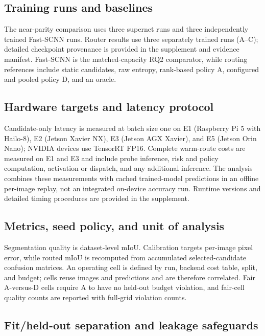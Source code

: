 \documentclass[a4paper,review,12pt]{elsarticle}
\newcommand{\miou}{mIoU}
\begin{document}
\subsection{Training runs and baselines}

The near-parity comparison uses three supernet runs and three independently trained Fast-SCNN runs. Router results use three separately trained runs (A--C); detailed checkpoint provenance is provided in the supplement and evidence manifest. Fast-SCNN is the matched-capacity RQ2 comparator, while routing references include static candidates, raw entropy, rank-based policy A, configured and pooled policy D, and an oracle.

\subsection{Hardware targets and latency protocol}

Candidate-only latency is measured at batch size one on E1 (Raspberry Pi 5 with Hailo-8), E2 (Jetson Xavier NX), E3 (Jetson AGX Xavier), and E5 (Jetson Orin Nano); NVIDIA devices use TensorRT FP16. Complete warm-route costs are measured on E1 and E3 and include probe inference, risk and policy computation, activation or dispatch, and any additional inference. The analysis combines these measurements with cached trained-model predictions in an offline per-image replay, not an integrated on-device accuracy run. Runtime versions and detailed timing procedures are provided in the supplement.

\subsection{Metrics, seed policy, and unit of analysis}

Segmentation quality is dataset-level \miou{}. Calibration targets per-image pixel error, while routed \miou{} is recomputed from accumulated selected-candidate confusion matrices. An operating cell is defined by run, backend cost table, split, and budget; cells reuse images and predictions and are therefore correlated. Fair A-versus-D cells require A to have no held-out budget violation, and fair-cell quality counts are reported with full-grid violation counts.

\subsection{Fit/held-out separation and leakage safeguards}
\label{sec:split}
\end{document}
